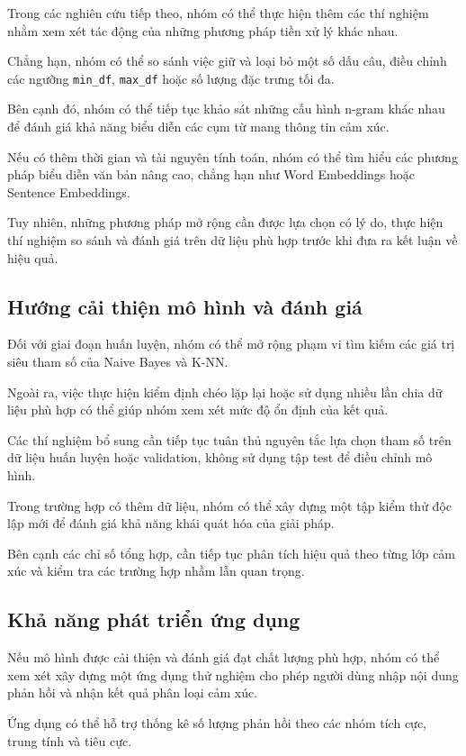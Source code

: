 Trong các nghiên cứu tiếp theo,
nhóm có thể thực hiện thêm các
thí nghiệm nhằm xem xét tác động
của những phương pháp tiền xử lý
khác nhau.

Chẳng hạn, nhóm có thể so sánh
việc giữ và loại bỏ một số dấu câu,
điều chỉnh các ngưỡng
\texttt{min\_df}, \texttt{max\_df}
hoặc số lượng đặc trưng tối đa.

Bên cạnh đó, nhóm có thể tiếp tục
khảo sát những cấu hình n-gram
khác nhau để đánh giá khả năng
biểu diễn các cụm từ mang
thông tin cảm xúc.

Nếu có thêm thời gian và tài nguyên
tính toán, nhóm có thể tìm hiểu
các phương pháp biểu diễn văn bản
nâng cao, chẳng hạn như
Word Embeddings hoặc Sentence Embeddings.

Tuy nhiên, những phương pháp mở rộng
cần được lựa chọn có lý do, thực hiện
thí nghiệm so sánh và đánh giá
trên dữ liệu phù hợp trước khi
đưa ra kết luận về hiệu quả.


\subsection{Hướng cải thiện mô hình và đánh giá}

Đối với giai đoạn huấn luyện,
nhóm có thể mở rộng phạm vi
tìm kiếm các giá trị siêu tham số
của Naive Bayes và K-NN.

Ngoài ra, việc thực hiện kiểm định
chéo lặp lại hoặc sử dụng nhiều
lần chia dữ liệu phù hợp có thể
giúp nhóm xem xét mức độ ổn định
của kết quả.

Các thí nghiệm bổ sung cần tiếp tục
tuân thủ nguyên tắc lựa chọn tham
số trên dữ liệu huấn luyện hoặc
validation, không sử dụng tập
test để điều chỉnh mô hình.

Trong trường hợp có thêm dữ liệu,
nhóm có thể xây dựng một tập
kiểm thử độc lập mới để đánh giá
khả năng khái quát hóa của giải pháp.

Bên cạnh các chỉ số tổng hợp,
cần tiếp tục phân tích hiệu quả
theo từng lớp cảm xúc và kiểm tra
các trường hợp nhầm lẫn quan trọng.


\subsection{Khả năng phát triển ứng dụng}

Nếu mô hình được cải thiện và
đánh giá đạt chất lượng phù hợp,
nhóm có thể xem xét xây dựng
một ứng dụng thử nghiệm cho phép
người dùng nhập nội dung phản hồi
và nhận kết quả phân loại cảm xúc.

Ứng dụng có thể hỗ trợ thống kê
số lượng phản hồi theo các nhóm
tích cực, trung tính và tiêu cực.

